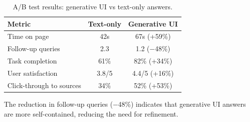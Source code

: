 \begin{table}[H]
\centering
\small
\begin{tabular}{lcc}
\toprule
\textbf{Metric} & \textbf{Text-only} & \textbf{Generative UI} \\
\midrule
Time on page & 42s & 67s (+59\%) \\
Follow-up queries & 2.3 & 1.2 ($-$48\%) \\
Task completion & 61\% & 82\% (+34\%) \\
User satisfaction & 3.8/5 & 4.4/5 (+16\%) \\
Click-through to sources & 34\% & 52\% (+53\%) \\
\bottomrule
\end{tabular}
\caption{A/B test results: generative UI vs text-only answers.}
\label{tab:ab_test}
\end{table}

The reduction in follow-up queries ($-$48\%) indicates that generative UI answers are more self-contained, reducing the need for refinement.

